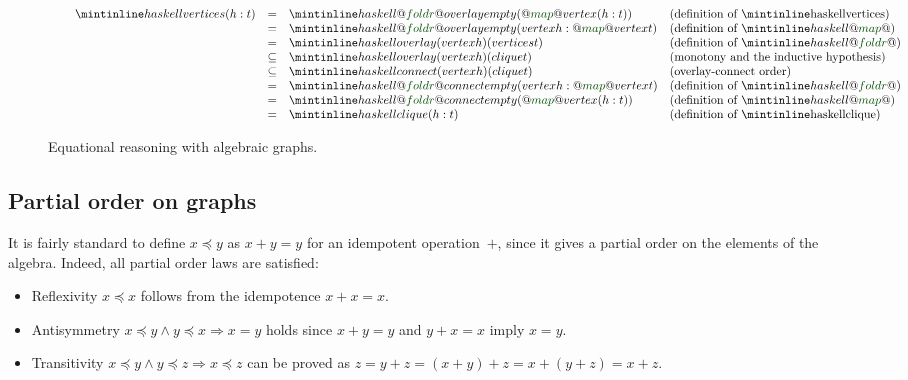 \begin{figure}
\[
\begin{array}{rcll}
\hspace{6mm}\hs{vertices (h:t)} & = & \hs{@\std{foldr}@ overlay empty (@\std{map}@ vertex (h:t))} & \text{(definition of \hs{vertices})}\\
 & = & \hs{@\std{foldr}@ overlay empty (vertex h : @\std{map}@ vertex t)} & \text{(definition of }\hs{@\std{map}@}\text{)}\\
 & = & \hs{overlay (vertex h) (vertices t)} & \text{(definition of }\hs{@\std{foldr}@}\text{)}\\
 & \subseteq & \hs{overlay (vertex h) (clique t)} & \text{(monotony and the inductive hypothesis)}\\
 & \subseteq & \hs{connect (vertex h) (clique t)} & \text{(overlay-connect order)}\\
 & = & \hs{@\std{foldr}@ connect empty (vertex h : @\std{map}@ vertex t)} & \text{(definition of }\hs{@\std{foldr}@}\text{)}\\
 & = & \hs{@\std{foldr}@ connect empty (@\std{map}@ vertex (h:t))} & \text{(definition of }\hs{@\std{map}@}\text{)}\\
 & = & \hs{clique (h:t)} & \text{(definition of \hs{clique})}\\
\end{array}
\]
\caption{Equational reasoning with algebraic graphs.\label{fig-proof}}
\end{figure}

\subsection{Partial order on graphs}\label{sub-partial-order}

It is fairly standard to define $x \preceq y$ as $x + y = y$ for an
idempotent operation~$+$, since it gives a partial order on the elements
of the algebra. Indeed, all partial order laws are satisfied:

\begin{itemize}
     \item Reflexivity $x \preceq x$ follows from the idempotence $x + x = x$.
     \item Antisymmetry $x \preceq y \wedge y \preceq x \Rightarrow x = y$ holds
     since $x + y = y$ and $y + x = x$ imply $x = y$.
     \item Transitivity $x \preceq y \wedge y \preceq z \Rightarrow x \preceq z$
     can be proved as $z = y + z = (x + y) + z = x + (y + z) = x + z$.
 \end{itemize}

